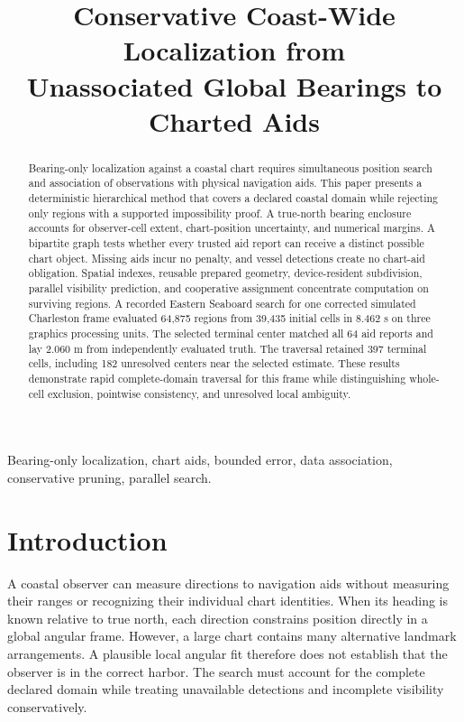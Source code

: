 \documentclass[conference]{IEEEtran}
\title{Conservative Coast-Wide Localization from\\Unassociated Global Bearings to Charted Aids}
\author{\IEEEauthorblockN{J.C. Vaught}}
\begin{document}
\maketitle
\begin{abstract}
Bearing-only localization against a coastal chart requires simultaneous position search and association of observations with physical navigation aids. This paper presents a deterministic hierarchical method that covers a declared coastal domain while rejecting only regions with a supported impossibility proof. A true-north bearing enclosure accounts for observer-cell extent, chart-position uncertainty, and numerical margins. A bipartite graph tests whether every trusted aid report can receive a distinct possible chart object. Missing aids incur no penalty, and vessel detections create no chart-aid obligation. Spatial indexes, reusable prepared geometry, device-resident subdivision, parallel visibility prediction, and cooperative assignment concentrate computation on surviving regions. A recorded Eastern Seaboard search for one corrected simulated Charleston frame evaluated 64,875 regions from 39,435 initial cells in 8.462 s on three graphics processing units. The selected terminal center matched all 64 aid reports and lay 2.060 m from independently evaluated truth. The traversal retained 397 terminal cells, including 182 unresolved centers near the selected estimate. These results demonstrate rapid complete-domain traversal for this frame while distinguishing whole-cell exclusion, pointwise consistency, and unresolved local ambiguity.
\end{abstract}
\begin{IEEEkeywords}
Bearing-only localization, chart aids, bounded error, data association, conservative pruning, parallel search.
\end{IEEEkeywords}

\section{Introduction}
A coastal observer can measure directions to navigation aids without measuring their ranges or recognizing their individual chart identities. When its heading is known relative to true north, each direction constrains position directly in a global angular frame. However, a large chart contains many alternative landmark arrangements. A plausible local angular fit therefore does not establish that the observer is in the correct harbor. The search must account for the complete declared domain while treating unavailable detections and incomplete visibility conservatively.
\end{document}
